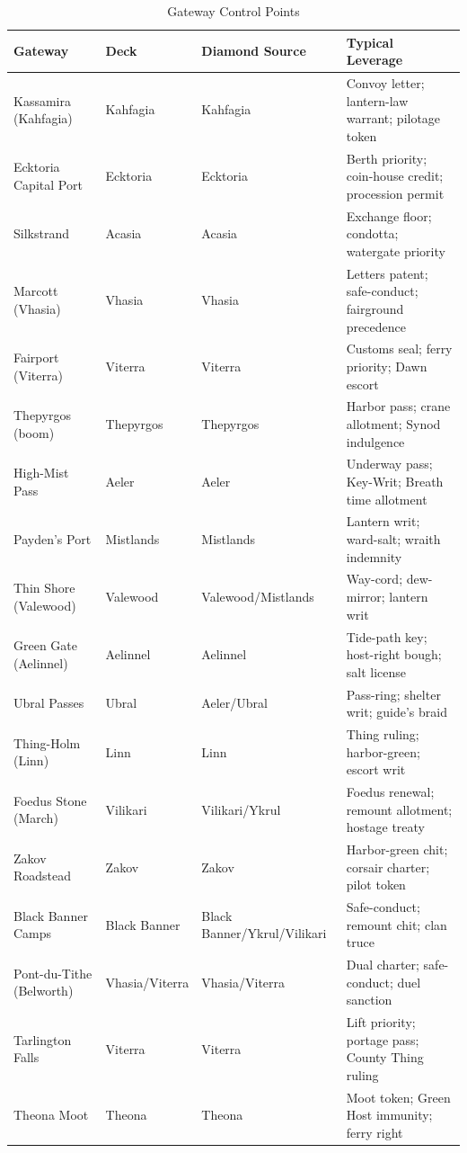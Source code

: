 \documentclass[12pt,oneside]{book}
\begin{document}
\begin{table}[h]
\centering
\begin{tabular}{|l|l|l|l|}
\hline
\textbf{Gateway} & \textbf{Deck} & \textbf{Diamond Source} & \textbf{Typical Leverage} \\
\hline
Kassamira (Kahfagia) & Kahfagia & Kahfagia & Convoy letter; lantern-law warrant; pilotage token \\
Ecktoria Capital Port & Ecktoria & Ecktoria & Berth priority; coin-house credit; procession permit \\
Silkstrand & Acasia & Acasia & Exchange floor; condotta; watergate priority \\
Marcott (Vhasia) & Vhasia & Vhasia & Letters patent; safe-conduct; fairground precedence \\
Fairport (Viterra) & Viterra & Viterra & Customs seal; ferry priority; Dawn escort \\
Thepyrgos (boom) & Thepyrgos & Thepyrgos & Harbor pass; crane allotment; Synod indulgence \\
High-Mist Pass & Aeler & Aeler & Underway pass; Key-Writ; Breath time allotment \\
Payden's Port & Mistlands & Mistlands & Lantern writ; ward-salt; wraith indemnity \\
Thin Shore (Valewood) & Valewood & Valewood/Mistlands & Way-cord; dew-mirror; lantern writ \\
Green Gate (Aelinnel) & Aelinnel & Aelinnel & Tide-path key; host-right bough; salt license \\
Ubral Passes & Ubral & Aeler/Ubral & Pass-ring; shelter writ; guide's braid \\
Thing-Holm (Linn) & Linn & Linn & Thing ruling; harbor-green; escort writ \\
Foedus Stone (March) & Vilikari & Vilikari/Ykrul & Foedus renewal; remount allotment; hostage treaty \\
Zakov Roadstead & Zakov & Zakov & Harbor-green chit; corsair charter; pilot token \\
Black Banner Camps & Black Banner & Black Banner/Ykrul/Vilikari & Safe-conduct; remount chit; clan truce \\
Pont-du-Tithe (Belworth) & Vhasia/Viterra & Vhasia/Viterra & Dual charter; safe-conduct; duel sanction \\
Tarlington Falls & Viterra & Viterra & Lift priority; portage pass; County Thing ruling \\
Theona Moot & Theona & Theona & Moot token; Green Host immunity; ferry right \\
\hline
\end{tabular}
\caption{Gateway Control Points}
\label{tab:gateways}
\end{table}
\end{document}
